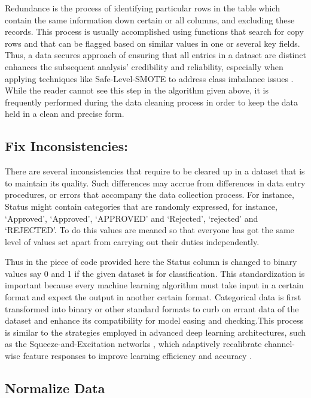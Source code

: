 \documentclass[12pt, a4paper,oneside]{book}
\numberwithin{equation}{section}
\begin{document}
Redundance is the process of identifying particular rows in the table which contain the same information down certain or all columns, and excluding these records. This process is usually accomplished using functions that search for copy rows and that can be flagged based on similar values in one or several key fields. Thus, a data secures approach of ensuring that all entries in a dataset are distinct enhances the subsequent analysis’ credibility and reliability, especially when applying techniques like Safe-Level-SMOTE to address class imbalance issues \cite{bunkhumpornpat2009safe}. While the reader cannot see this step in the algorithm given above, it is frequently performed during the data cleaning process in order to keep the data held in a clean and precise form. 

\subsection{Fix Inconsistencies:} 

There are several inconsistencies that require to be cleared up in a dataset that is to maintain its quality. Such differences may accrue from differences in data entry procedures, or errors that accompany the data collection process. For instance, Status might contain categories that are randomly expressed, for instance, ‘Approved’, ‘Approved’, ‘APPROVED’ and ‘Rejected’, ‘rejected’ and ‘REJECTED’. To do this values are meaned so that everyone has got the same level of values set apart from carrying out their duties independently. 

Thus in the piece of code provided here the Status column is changed to binary values say 0 and 1 if the given dataset is for classification. This standardization is important because every machine learning algorithm must take input in a certain format and expect the output in another certain format. Categorical data is first transformed into binary or other standard formats to curb on errant data of the dataset and enhance its compatibility for model easing and checking.This process is similar to the strategies employed in advanced deep learning architectures, such as the Squeeze-and-Excitation networks , which adaptively recalibrate channel-wise feature responses to improve learning efficiency and accuracy \cite{hu2018squeeze}.
 
\subsection{Normalize Data} 
\end{document}
